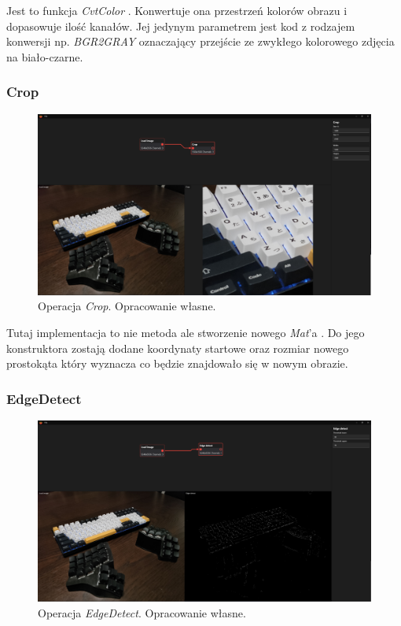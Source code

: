 Jest to funkcja \textit{CvtColor} \cite{cvtcol}. Konwertuje ona przestrzeń kolorów obrazu i dopasowuje ilość kanałów.
Jej jedynym parametrem jest kod z rodzajem konwersji np. \textit{BGR2GRAY} oznaczający przejście ze zwykłego kolorowego zdjęcia na biało-czarne.

\subsubsection{Crop}

\begin{figure}[H]
    \centering
    \includegraphics[width=1\linewidth]{images/Picture24.png}
    \caption{Operacja \textit{Crop}. Opracowanie własne.}
    \label{fig:crop}
\end{figure}

Tutaj implementacja to nie metoda ale stworzenie nowego \textit{Mat}'a \cite{mat}.
Do jego konstruktora zostają dodane koordynaty startowe oraz rozmiar nowego prostokąta który wyznacza co będzie znajdowało się w nowym obrazie.

\subsubsection{EdgeDetect}

\begin{figure}[H]
    \centering
    \includegraphics[width=1\linewidth]{images/Picture25.png}
    \caption{Operacja \textit{EdgeDetect}. Opracowanie własne.}
    \label{fig:edgeDetect}
\end{figure}  

